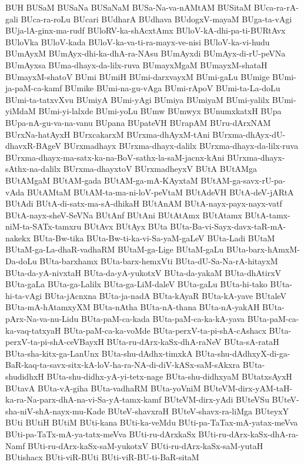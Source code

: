 {BUH
BUSaM
BUSaNa
BUSaNaM
BUSa-Na-va-nAMtAM
BUSitaM
BUca-ra-rA-gali
BUca-ra-roLu
BUcari
BUdharA
BUdhava
BUdogxV-mayaM
BUga-ta-vAgi
BUja-lA-ginx-ma-rudf
BUloRV-ka-shAcxtAmx
BUloV-kA-dhi-pa-ti-BURtAvx
BUloVka
BUloV-kada
BUloV-ka-va-ti-ra-mayx-ve-nisi
BUloV-ka-vi-hudu
BUmAyxM
BUmAyx-dhi-ka-dhA-ra-NAsu
BUmAyxdi
BUmAyx-di-rU-peVNa
BUmAyxsa
BUma-dhayx-da-lilx-ruva
BUmayxMgaM
BUmayxM-shataH
BUmayxM-shatoV
BUmi
BUmiH
BUmi-darxvayxM
BUmi-gaLu
BUmige
BUmi-ja-paM-ca-kamf
BUmike
BUmi-na-gu-vAga
BUmi-rApoV
BUmi-ta-La-doLu
BUmi-ta-tatxvXvu
BUmiyA
BUmi-yAgi
BUmiya
BUmiyaM
BUmi-yalilx
BUmi-yiMdaM
BUmi-yi-lalxde
BUmi-yoLu
BUmw
BUmwyx
BUnumxkatxH
BUpa
BUpa-nA-gu-va-na-vanu
BUpana
BUpateVH
BUrapAM
BUru-dArxNAM
BUrxNa-hatAyxH
BUrxcakarxM
BUrxma-dhAyxM-tAni
BUrxma-dhAyx-dU-dhavxR-BAgeV
BUrxmadhayx
BUrxma-dhayx-dalilx
BUrxma-dhayx-da-lilx-ruva
BUrxma-dhayx-ma-satx-ka-na-BoV-sathx-la-saM-jacnx-kAni
BUrxma-dhayx-sAthx-na-dalilx
BUrxma-dhayxtoV
BUrxmadheyxV
BUtA
BUtAMga
BUtAMgaM
BUtAM-gada
BUtAM-ga-mA-KAyxtaM
BUtAM-ga-savx-rU-pa-vAda
BUtAMtaM
BUtAM-ta-ma-ni-loV-peVtaM
BUtAdeVH
BUtA-deV-jARtA
BUtAdi
BUtA-di-satx-ma-sA-dhikaH
BUtAnAM
BUtA-nayx-payx-nayx-vatf
BUtA-nayx-sheV-SeVNa
BUtAnf
BUtAni
BUtAtAmx
BUtAtamx
BUtA-tamx-niM-ta-SATx-tamxru
BUtAvx
BUtAyx
BUta
BUta-Ba-vi-Sayx-davx-taR-mA-nakekx
BUta-Bw-tika
BUta-Bw-ti-ka-vi-Sa-yaM-gaLeV
BUta-Ladi
BUtaM
BUtaM-ga-La-dhaR-vadhaRM
BUtaM-ga-Lige
BUtaM-gaLu
BUta-barx-hAmxM-Da-doLu
BUta-barxhamx
BUta-barx-hemxVti
BUta-dU-Sa-Na-rA-hitayxM
BUta-da-yA-nivxtaH
BUta-da-yA-yukotxV
BUta-da-yakaM
BUta-dhAtirxV
BUta-gaLa
BUta-ga-Lalilx
BUta-ga-LiM-daleV
BUta-gaLu
BUta-hi-tako
BUta-hi-ta-vAgi
BUta-jAcnxna
BUta-ja-nadA
BUta-kAyaR
BUta-kA-yave
BUtaleV
BUta-mA-hAtamxyXM
BUta-nAtha
BUta-nA-thana
BUta-nA-yakAH
BUta-pArx-Na-va-nu-Lidu
BUta-paM-ca-kada
BUta-paM-ca-ka-kA-yava
BUta-paM-ca-ka-vaq-tatxyaH
BUta-paM-ca-ka-voMde
BUta-perxV-ta-pi-shA-cAshacx
BUta-perxV-ta-pi-shA-ceVBayxH
BUta-ru-dArx-kaSx-dhA-raNeV
BUta-sA-rataH
BUta-sha-kitx-ga-LanUnx
BUta-shu-dAdhx-timxkA
BUta-shu-dAdhxyX-di-ga-BaR-kaq-ta-savx-sitx-kA-loV-ha-ra-NA-di-diV-kASx-saM-sAkxra
BUta-shudidhxH
BUta-shu-didhx-yA-yi-tetx-nage
BUta-shu-didhxyaM
BUtatxsAyxH
BUtavA
BUta-vA-giha
BUta-vadhaRM
BUta-yoVniM
BUteVM-dirx-yAM-taH-ka-ra-Na-parx-dhA-na-vi-Sa-yA-tamx-kamf
BUteVM-dirx-yAdi
BUteVSu
BUteV-sha-niV-shA-nayx-mu-Kade
BUteV-shavxraH
BUteV-shavx-ra-liMga
BUteyxY
BUti
BUtiH
BUtiM
BUti-kana
BUti-ka-veMdu
BUti-pa-TaTax-mA-yatax-meVva
BUti-pa-TaTx-mA-ya-tatx-meVva
BUti-ru-dArxkaSx
BUti-ru-dArx-kaSx-dhA-ra-Namf
BUti-ru-dArx-kaSx-saM-yukotxV
BUti-ru-dArx-kaSx-saM-yutaH
BUtishacx
BUti-viR-BUti
BUti-viR-BU-ti-BaR-sitaM
}
